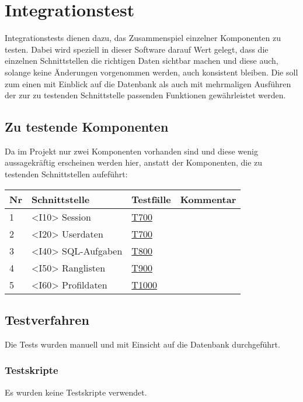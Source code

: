 
\chapter{Integrationstest}

Integrationstests dienen dazu, das Zusammenspiel einzelner Komponenten zu testen. Dabei wird speziell in dieser Software darauf Wert gelegt, dass die einzelnen Schnittstellen die richtigen Daten sichtbar machen und diese auch, solange keine Änderungen vorgenommen werden, auch konsistent bleiben. Die soll zum einen mit Einblick auf die Datenbank als auch mit mehrmaligen Ausführen der zur zu testenden Schnittstelle passenden Funktionen gewährleistet werden.

\section{Zu testende Komponenten}

Da im Projekt nur zwei Komponenten vorhanden sind und diese wenig aussagekräftig erscheinen werden hier, anstatt der Komponenten, die zu testenden Schnittstellen aufeführt:

\begin{center}
	\begin{longtable}{|m{}|m{}|m{}|m{}|}
		\hline
		\textbf{Nr} & \textbf{Schnittstelle} & \textbf{Testfälle} & \textbf{Kommentar}\\
		\hline
		1  & <I10> Session  &  \hyperref[T700]{T700}   &    \\ 
		\hline
          		2  & <I20> Userdaten &  \hyperref[T700]{T700}      & \\ 
		\hline
		3  & <I40> SQL-Aufgaben &  \hyperref[T800]{T800}       & \\ 
		\hline
		4  & <I50> Ranglisten &  \hyperref[T900]{T900}       & \\ 
		\hline
		5  & <I60> Profildaten &  \hyperref[T1000]{T1000}       & \\ 
		\hline
	\end{longtable}
\end{center}

\section{Testverfahren}
Die Tests wurden manuell und mit Einsicht auf die Datenbank durchgeführt.

\subsection{Testskripte}
Es wurden keine Testskripte verwendet.

